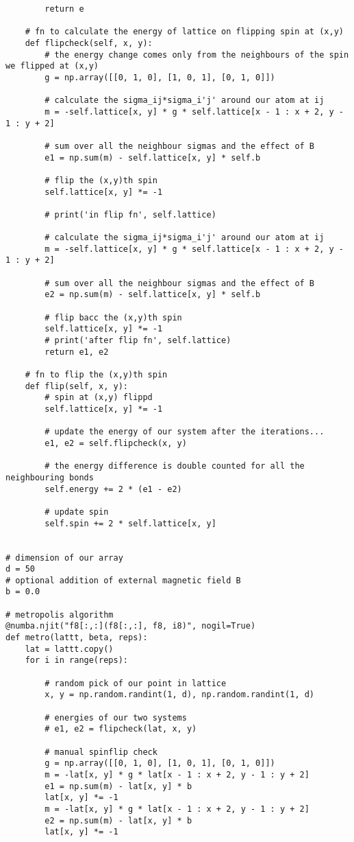 \begin{verbatim}
        return e

    # fn to calculate the energy of lattice on flipping spin at (x,y)
    def flipcheck(self, x, y):
        # the energy change comes only from the neighbours of the spin we flipped at (x,y)
        g = np.array([[0, 1, 0], [1, 0, 1], [0, 1, 0]])

        # calculate the sigma_ij*sigma_i'j' around our atom at ij
        m = -self.lattice[x, y] * g * self.lattice[x - 1 : x + 2, y - 1 : y + 2]

        # sum over all the neighbour sigmas and the effect of B
        e1 = np.sum(m) - self.lattice[x, y] * self.b

        # flip the (x,y)th spin
        self.lattice[x, y] *= -1

        # print('in flip fn', self.lattice)

        # calculate the sigma_ij*sigma_i'j' around our atom at ij
        m = -self.lattice[x, y] * g * self.lattice[x - 1 : x + 2, y - 1 : y + 2]

        # sum over all the neighbour sigmas and the effect of B
        e2 = np.sum(m) - self.lattice[x, y] * self.b

        # flip bacc the (x,y)th spin
        self.lattice[x, y] *= -1
        # print('after flip fn', self.lattice)
        return e1, e2

    # fn to flip the (x,y)th spin
    def flip(self, x, y):
        # spin at (x,y) flippd
        self.lattice[x, y] *= -1

        # update the energy of our system after the iterations...
        e1, e2 = self.flipcheck(x, y)

        # the energy difference is double counted for all the neighbouring bonds
        self.energy += 2 * (e1 - e2)

        # update spin
        self.spin += 2 * self.lattice[x, y]


# dimension of our array
d = 50
# optional addition of external magnetic field B
b = 0.0

# metropolis algorithm
@numba.njit("f8[:,:](f8[:,:], f8, i8)", nogil=True)
def metro(lattt, beta, reps):
    lat = lattt.copy()
    for i in range(reps):

        # random pick of our point in lattice
        x, y = np.random.randint(1, d), np.random.randint(1, d)

        # energies of our two systems
        # e1, e2 = flipcheck(lat, x, y)

        # manual spinflip check
        g = np.array([[0, 1, 0], [1, 0, 1], [0, 1, 0]])
        m = -lat[x, y] * g * lat[x - 1 : x + 2, y - 1 : y + 2]
        e1 = np.sum(m) - lat[x, y] * b
        lat[x, y] *= -1
        m = -lat[x, y] * g * lat[x - 1 : x + 2, y - 1 : y + 2]
        e2 = np.sum(m) - lat[x, y] * b
        lat[x, y] *= -1


\end{verbatim}
